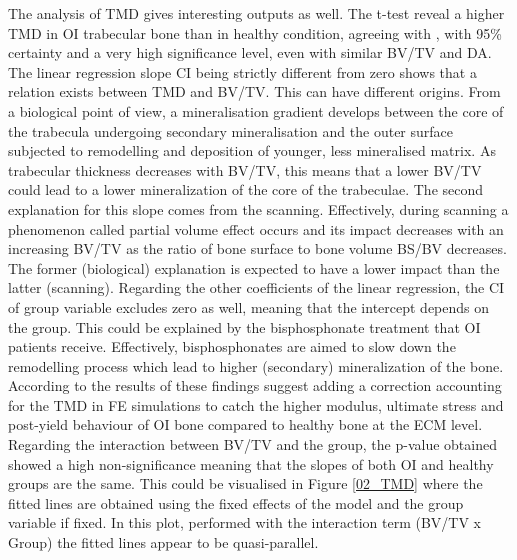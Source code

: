 \documentclass[a4paper,fleqn]{DC_ArtStyle}
\begin{document}
	The analysis of TMD gives interesting outputs as well. The t-test reveal a higher TMD in OI trabecular bone than in healthy condition, agreeing with \citeauthor{Boyde1999}\cite{Boyde1999}, with 95\% certainty and a very high significance level, even with similar BV/TV and DA. The linear regression slope CI being strictly different from zero shows that a relation exists between TMD and BV/TV. This can have different origins. From a biological point of view, a mineralisation gradient develops between the core of the trabecula undergoing secondary mineralisation and the outer surface subjected to remodelling and deposition of younger, less mineralised matrix. As trabecular thickness decreases with BV/TV, this means that a lower BV/TV could lead to a lower mineralization of the core of the trabeculae. The second explanation for this slope comes from the scanning. Effectively, during scanning a phenomenon called partial volume effect occurs and its impact decreases with an increasing BV/TV as the ratio of bone surface to bone volume BS/BV decreases. The former (biological) explanation is expected to have a lower impact than the latter (scanning). Regarding the other coefficients of the linear regression, the CI of group variable excludes zero as well, meaning that the intercept depends on the group. This could be explained by the bisphosphonate treatment that OI patients receive. Effectively, bisphosphonates are aimed to slow down the remodelling process which lead to higher (secondary) mineralization of the bone. According to the results of \citeauthor{Indermaur2021}\cite{Indermaur2021} these findings suggest adding a correction accounting for the TMD in FE simulations to catch the higher modulus, ultimate stress and post-yield behaviour of OI bone compared to healthy bone at the ECM level. Regarding the interaction between BV/TV and the group, the p-value obtained showed a high non-significance meaning that the slopes of both OI and healthy groups are the same. This could be visualised in Figure \ref{02_TMD} where the fitted lines are obtained using the fixed effects of the model and the group variable if fixed. In this plot, performed with the interaction term (BV/TV x Group) the fitted lines appear to be quasi-parallel. \\
	
\end{document}
